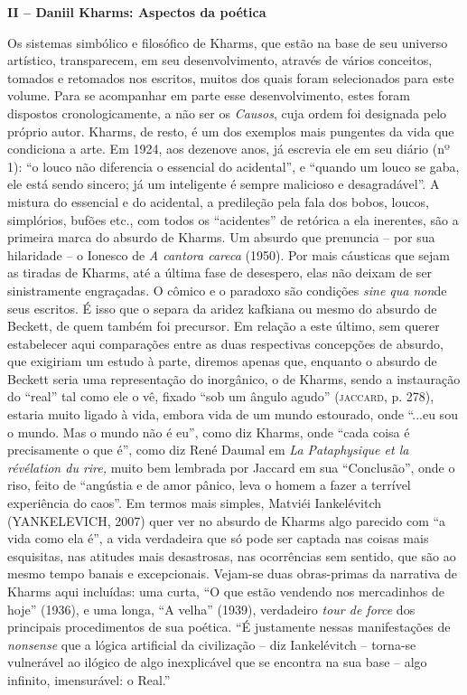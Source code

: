 \textbf{II -- Daniil Kharms: Aspectos da poética}

Os sistemas simbólico e filosófico de Kharms, que estão na base de seu
universo artístico, transparecem, em seu desenvolvimento, através de
vários conceitos, tomados e retomados nos escritos, muitos dos quais
foram selecionados para este volume. Para se acompanhar em parte esse
desenvolvimento, estes foram dispostos cronologicamente, a não ser os
\emph{Causos}, cuja ordem foi designada pelo próprio autor. Kharms, de
resto, é um dos exemplos mais pungentes da vida que condiciona a arte.
Em 1924, aos dezenove anos, já escrevia ele em seu diário (nº 1): ``o
louco não diferencia o essencial do acidental'', e ``quando um louco se
gaba, ele está sendo sincero; já um inteligente é sempre malicioso e
desagradável''. A mistura do essencial e do acidental, a predileção pela
fala dos bobos, loucos, simplórios, bufões etc., com todos os
``acidentes'' de retórica a ela inerentes, são a primeira marca do
absurdo de Kharms. Um absurdo que prenuncia -- por sua hilaridade -- o
Ionesco de \emph{A cantora careca} (1950). Por mais cáusticas que sejam
as tiradas de Kharms, até a última fase de desespero, elas não deixam de
ser sinistramente engraçadas. O cômico e o paradoxo são condições
\emph{sine qua non}de seus escritos. É isso que o separa da aridez
kafkiana ou mesmo do absurdo de Beckett, de quem também foi precursor.
Em relação a este último, sem querer estabelecer aqui comparações entre
as duas respectivas concepções de absurdo, que exigiriam um estudo à
parte, diremos apenas que, enquanto o absurdo de Beckett seria uma
representação do inorgânico, o de Kharms, sendo a instauração do
``real'' tal como ele o vê, fixado ``sob um ângulo agudo''
(\textsc{jaccard}, p. 278), estaria muito ligado à vida, embora vida de
um mundo estourado, onde ``...eu sou o mundo. Mas o mundo não é eu'',
como diz Kharms, onde ``cada coisa é precisamente o que é'', como diz
René Daumal em \emph{La Pataphysique et la révélation du rire,} muito
bem lembrada por Jaccard em sua ``Conclusão'', onde o riso, feito de
``angústia e de amor pânico, leva o homem a fazer a terrível experiência
do caos''. Em termos mais simples, Matviéi Iankelévitch (YANKELEVICH,
2007) quer ver no absurdo de Kharms algo parecido com ``a vida como ela
é'', a vida verdadeira que só pode ser captada nas coisas mais
esquisitas, nas atitudes mais desastrosas, nas ocorrências sem sentido,
que são ao mesmo tempo banais e excepcionais. Vejam-se duas obras-primas
da narrativa de Kharms aqui incluídas: uma curta, ``O que estão vendendo
nos mercadinhos de hoje'' (1936), e uma longa, ``A velha'' (1939),
verdadeiro \emph{tour de force} dos principais procedimentos de sua
poética. ``É justamente nessas manifestações de \emph{nonsense} que a
lógica artificial da civilização -- diz Iankelévitch -- torna-se
vulnerável ao ilógico de algo inexplicável que se encontra na sua base
-- algo infinito, imensurável: o Real.''


